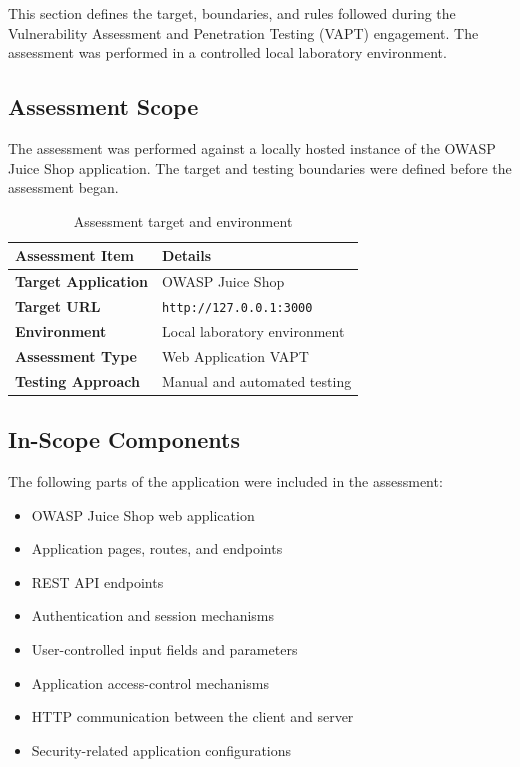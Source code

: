 This section defines the target, boundaries, and rules followed during
the Vulnerability Assessment and Penetration Testing (VAPT) engagement.
The assessment was performed in a controlled local laboratory
environment.

\subsection{Assessment Scope}

The assessment was performed against a locally hosted instance of the
OWASP Juice Shop application. The target and testing boundaries were
defined before the assessment began.

\begin{table}[!htb]
\centering
\begin{tabularx}{\textwidth}{>{\bfseries}p{} X}
\toprule
Assessment Item & Details \\
\midrule
Target Application & OWASP Juice Shop \\
Target URL & \texttt{http://127.0.0.1:3000} \\
Environment & Local laboratory environment \\
Assessment Type & Web Application VAPT \\
Testing Approach & Manual and automated testing \\
\bottomrule
\end{tabularx}
\caption{Assessment target and environment}
\end{table}

\subsection{In-Scope Components}

The following parts of the application were included in the
assessment:

\begin{itemize}
    \item OWASP Juice Shop web application
    \item Application pages, routes, and endpoints
    \item REST API endpoints
    \item Authentication and session mechanisms
    \item User-controlled input fields and parameters
    \item Application access-control mechanisms
    \item HTTP communication between the client and server
    \item Security-related application configurations
\end{itemize}

